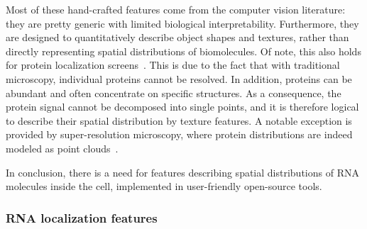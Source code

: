 Most of these hand-crafted features come from the computer vision literature: they are pretty generic with limited biological interpretability. Furthermore, they are designed to quantitatively describe object shapes and textures, rather than directly representing spatial distributions of biomolecules. Of note, this also holds for protein localization screens~\cite{Glory2007, Ouyang2019b}. This is due to the fact that with traditional microscopy, individual proteins cannot be resolved. In addition, proteins can be abundant and often concentrate on specific structures. As a consequence, the protein signal cannot be decomposed into single points, and it is therefore logical to describe their spatial distribution by texture features. A notable exception is provided by super-resolution microscopy, where protein distributions are indeed modeled as point clouds~\cite{Levet2019}. 

In conclusion, there is a need for features describing spatial distributions of RNA molecules inside the cell, implemented in user-friendly open-source tools. 




\subsubsection{\ac{RNA} localization features}


